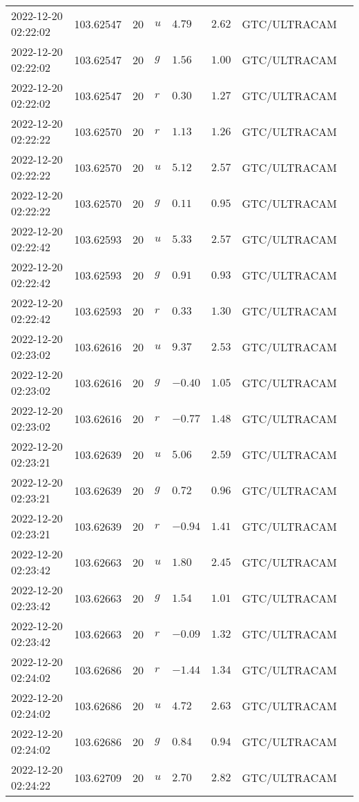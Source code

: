 \documentclass{nature_plusfigure}
\begin{document}
\begin{supplement}
\begin{center}
\begin{longtable}{llllllll}
2022-12-20 02:22:02 & 103.62547 & 20 & $u$ & $4.79$ & $2.62$ & GTC/ULTRACAM &  \\ 
2022-12-20 02:22:02 & 103.62547 & 20 & $g$ & $1.56$ & $1.00$ & GTC/ULTRACAM &  \\ 
2022-12-20 02:22:02 & 103.62547 & 20 & $r$ & $0.30$ & $1.27$ & GTC/ULTRACAM &  \\ 
2022-12-20 02:22:22 & 103.62570 & 20 & $r$ & $1.13$ & $1.26$ & GTC/ULTRACAM &  \\ 
2022-12-20 02:22:22 & 103.62570 & 20 & $u$ & $5.12$ & $2.57$ & GTC/ULTRACAM &  \\ 
2022-12-20 02:22:22 & 103.62570 & 20 & $g$ & $0.11$ & $0.95$ & GTC/ULTRACAM &  \\ 
2022-12-20 02:22:42 & 103.62593 & 20 & $u$ & $5.33$ & $2.57$ & GTC/ULTRACAM &  \\ 
2022-12-20 02:22:42 & 103.62593 & 20 & $g$ & $0.91$ & $0.93$ & GTC/ULTRACAM &  \\ 
2022-12-20 02:22:42 & 103.62593 & 20 & $r$ & $0.33$ & $1.30$ & GTC/ULTRACAM &  \\ 
2022-12-20 02:23:02 & 103.62616 & 20 & $u$ & $9.37$ & $2.53$ & GTC/ULTRACAM &  \\ 
2022-12-20 02:23:02 & 103.62616 & 20 & $g$ & $-0.40$ & $1.05$ & GTC/ULTRACAM &  \\ 
2022-12-20 02:23:02 & 103.62616 & 20 & $r$ & $-0.77$ & $1.48$ & GTC/ULTRACAM &  \\ 
2022-12-20 02:23:21 & 103.62639 & 20 & $u$ & $5.06$ & $2.59$ & GTC/ULTRACAM &  \\ 
2022-12-20 02:23:21 & 103.62639 & 20 & $g$ & $0.72$ & $0.96$ & GTC/ULTRACAM &  \\ 
2022-12-20 02:23:21 & 103.62639 & 20 & $r$ & $-0.94$ & $1.41$ & GTC/ULTRACAM &  \\ 
2022-12-20 02:23:42 & 103.62663 & 20 & $u$ & $1.80$ & $2.45$ & GTC/ULTRACAM &  \\ 
2022-12-20 02:23:42 & 103.62663 & 20 & $g$ & $1.54$ & $1.01$ & GTC/ULTRACAM &  \\ 
2022-12-20 02:23:42 & 103.62663 & 20 & $r$ & $-0.09$ & $1.32$ & GTC/ULTRACAM &  \\ 
2022-12-20 02:24:02 & 103.62686 & 20 & $r$ & $-1.44$ & $1.34$ & GTC/ULTRACAM &  \\ 
2022-12-20 02:24:02 & 103.62686 & 20 & $u$ & $4.72$ & $2.63$ & GTC/ULTRACAM &  \\ 
2022-12-20 02:24:02 & 103.62686 & 20 & $g$ & $0.84$ & $0.94$ & GTC/ULTRACAM &  \\ 
2022-12-20 02:24:22 & 103.62709 & 20 & $u$ & $2.70$ & $2.82$ & GTC/ULTRACAM &  \\ 

\end{longtable}
\end{center}
\end{supplement}
\end{document}
